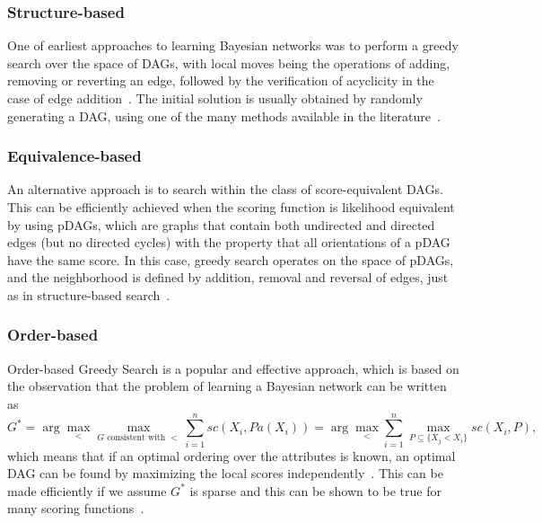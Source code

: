 \subsubsection{Structure-based}
\label{subsub:structurebased}
One of earliest approaches to learning Bayesian networks was to perform a greedy search over the space of DAGs, with local moves being the operations of adding, removing or reverting an edge, followed by the verification of acyclicity in the case of edge addition~\cite{Cooper92,GH08}. The initial solution is usually obtained by randomly generating a DAG, using one of the many methods available in the literature~\cite{Cozman02,Melancon04}.

\subsubsection{Equivalence-based}
\label{subsub:equivalencebased}
An alternative approach is to search within the class of score-equivalent DAGs. This can be efficiently achieved when the scoring function is likelihood equivalent by using pDAGs, which are graphs that contain both undirected and directed edges (but no directed cycles) with the property that all orientations of a pDAG have the same score. In this case, greedy search operates on the space of pDAGs, and the neighborhood is defined by addition, removal and reversal of edges, just as in structure-based search~\cite{Maxwell96,Maxwell02}.

\subsubsection{Order-based}
\label{subsub:orderbased}
Order-based Greedy Search is a popular and effective approach, which is based on the observation that the problem of learning a Bayesian network can be written as
	\begin{equation}
		\label{eq:orderreduced}
		G^* = \arg \max_{<} \max_{G \text{ consistent with } <} \sum_{i=1}^{n} {sc}( X_i , {Pa}( X_i ) ) = \arg \max_{<} \sum_{i=1}^{n} \max_{P \subseteq \{ X_j < X_i \}} {sc}( X_i , P ) ,
	\end{equation}
which means that if an optimal ordering over the attributes is known, an optimal DAG can be found by maximizing the local scores independently~\cite{TK05}. This can be made efficiently if we assume $G^*$ is sparse and this can be shown to be true for many scoring functions~\cite{Cassio11}.

